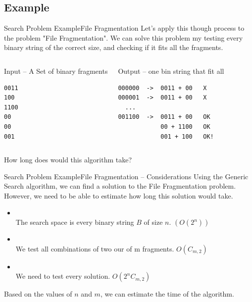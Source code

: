\subsection{Example}
\begin{frame}[fragile]{Search Problem Example}{File Fragmentation}
  Let's apply this though process to the problem "File Fragmentation". We can solve this problem my testing every binary string of the correct size, and
  checking if it fits all the fragments.\medskip

  \begin{columns}[T]
  \begin{block}{Input -- A Set of binary fragments}
\begin{verbatim}
0011
100
1100
00
00
001
\end{verbatim}
  \end{block}
  \begin{exampleblock}{Output -- one bin string that fit all}
\begin{verbatim}
000000  ->  0011 + 00   X
000001  ->  0011 + 00   X
  ...
001100  ->  0011 + 00   OK
            00 + 1100   OK
            001 + 100   OK!
\end{verbatim}
  \end{exampleblock}
\end{columns}\bigskip

  How long does would this algorithm take?
\end{frame}

\begin{frame}{Search Problem Example}{File Fragmentation -- Considerations}
  Using the Generic Search algorithm, we can find a solution to the File Fragmentation problem. However, we need to be able to estimate how long this solution would take.

  \begin{itemize}
  \item {}\\
    The search space is every binary string $B$ of size $n$. $(O(2^n))$
    \bigskip

  \item {}\\
    We test all combinations of two our of m fragments. $O(C_{m,2})$
    \bigskip

  \item {}\\
    We need to test every solution. $O(2^nC_{m,2})$
  \end{itemize}
  \bigskip

  Based on the values of $n$ and $m$, we can estimate the time of the algorithm.
\end{frame}

